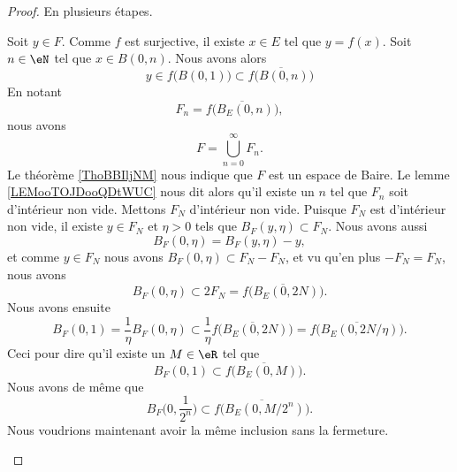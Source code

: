 \begin{proof}
	En plusieurs étapes.
	\begin{subproof}
		Soit \( y\in F\). Comme \( f\) est surjective, il existe \( x\in E\) tel que \( y=f(x)\). Soit \( n\in \eN\) tel que \( x\in B(0,n)\). Nous avons alors
		\begin{equation}
			y\in f\big( B(0,1) \big)\subset \overline{ f\big( B(0,n) \big) }
		\end{equation}
		En notant
		\begin{equation}
			F_n=\overline{ f\big( B_E(0,n) \big) },
		\end{equation}
		nous avons
		\begin{equation}
			F=\bigcup_{n=0}^{\infty}F_n.
		\end{equation}
		Le théorème \ref{ThoBBIljNM} nous indique que \( F\) est un espace de Baire. Le lemme \ref{LEMooTOJDooQDtWUC} nous dit alors qu'il existe un \( n\) tel que \( F_n\) soit d'intérieur non vide. Mettons \( F_N\) d'intérieur non vide.
		Puisque \( F_N\) est d'intérieur non vide, il existe \( y\in F_N\) et \( \eta>0\) tels que \( B_F(y,\eta)\subset F_N\). Nous avons aussi
		\begin{equation}
			B_F(0,\eta)=B_F(y,\eta)-y,
		\end{equation}
		et comme \( y\in F_N\) nous avons \( B_F(0,\eta)\subset F_N-F_N\), et vu qu'en plus \( -F_N=F_N\), nous avons
		\begin{equation}
			B_F(0,\eta)\subset 2F_N=\overline{ f\big( B_E(0,2N) \big) }.
		\end{equation}
		Nous avons ensuite
		\begin{equation}
			B_F(0,1)=\frac{1}{ \eta }B_F(0,\eta)\subset\frac{1}{ \eta }\overline{ f\big( B_E(0,2N) \big) }=\overline{ f\big( B_E(0,2N/\eta) \big) }.
		\end{equation}
		Ceci pour dire qu'il existe un \( M\in \eR\) tel que
		\begin{equation}
			B_F(0,1)\subset \overline{ f\big( B_E(0,M) \big) }.
		\end{equation}
		Nous avons de même que
		\begin{equation}        \label{EQooCMSPooYtzAuC}
			B_F\big( 0,\frac{1}{ 2^n } \big)\subset \overline{ f\big( B_E(0,M/2^n) \big) }.
		\end{equation}
		Nous voudrions maintenant avoir la même inclusion sans la fermeture.


\end{subproof}
\end{proof}
